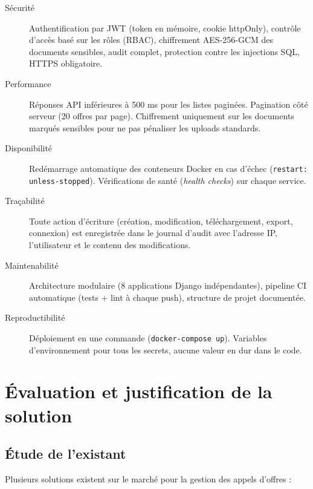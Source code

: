 \begin{description}
    \item[Sécurité] Authentification par JWT (token en mémoire, cookie httpOnly), contrôle d'accès basé sur les rôles (RBAC), chiffrement AES-256-GCM des documents sensibles, audit complet, protection contre les injections SQL, HTTPS obligatoire.

    \item[Performance] Réponses API inférieures à 500 ms pour les listes paginées. Pagination côté serveur (20 offres par page). Chiffrement uniquement sur les documents marqués sensibles pour ne pas pénaliser les uploads standards.

    \item[Disponibilité] Redémarrage automatique des conteneurs Docker en cas d'échec (\texttt{restart: unless-stopped}). Vérifications de santé (\textit{health checks}) sur chaque service.

    \item[Traçabilité] Toute action d'écriture (création, modification, téléchargement, export, connexion) est enregistrée dans le journal d'audit avec l'adresse IP, l'utilisateur et le contenu des modifications.

    \item[Maintenabilité] Architecture modulaire (8 applications Django indépendantes), pipeline CI automatique (tests + lint à chaque push), structure de projet documentée.

    \item[Reproductibilité] Déploiement en une commande (\texttt{docker-compose up}). Variables d'environnement pour tous les secrets, aucune valeur en dur dans le code.
\end{description}

\section{Évaluation et justification de la solution}

\subsection{Étude de l'existant}

Plusieurs solutions existent sur le marché pour la gestion des appels d'offres :

